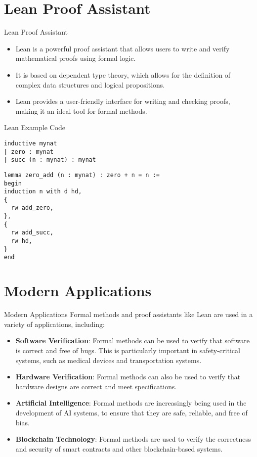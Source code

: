 \documentclass{beamer}
\begin{document}
\section{Lean Proof Assistant}

\begin{frame}{Lean Proof Assistant}
\begin{itemize}
\item Lean is a powerful proof assistant that allows users to write and verify mathematical proofs using formal logic.
\item It is based on dependent type theory, which allows for the definition of complex data structures and logical propositions.
\item Lean provides a user-friendly interface for writing and checking proofs, making it an ideal tool for formal methods.
\end{itemize}
\end{frame}

\begin{frame}[fragile]{Lean Example Code}
\begin{lstlisting}
inductive mynat
| zero : mynat
| succ (n : mynat) : mynat
\end{lstlisting}
\begin{lstlisting}
lemma zero_add (n : mynat) : zero + n = n :=
begin
induction n with d hd,
{
  rw add_zero,
},
{
  rw add_succ,
  rw hd,
}
end
\end{lstlisting}
\end{frame}

\section{Modern Applications}

\begin{frame}{Modern Applications}
Formal methods and proof assistants like Lean are used in a variety of applications, including:
\begin{itemize}
\item \textbf{Software Verification}: Formal methods can be used to verify that software is correct and free of bugs. This is particularly important in safety-critical systems, such as medical devices and transportation systems.
\item \textbf{Hardware Verification}: Formal methods can also be used to verify that hardware designs are correct and meet specifications.
\item \textbf{Artificial Intelligence}: Formal methods are increasingly being used in the development of AI systems, to ensure that they are safe, reliable, and free of bias.
\item \textbf{Blockchain Technology}: Formal methods are used to verify the correctness and security of smart contracts and other blockchain-based systems.
\end{itemize}
\end{frame}
\end{document}
